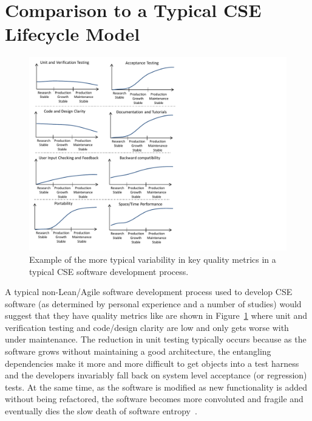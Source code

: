 \documentclass[11pt]{SANDreport}
\begin{document}
%
\section{Comparison to a Typical CSE Lifecycle Model}
\label{sec:compare_with_typical_CSE_model}
%

\begin{figure}
\begin{center}
\includegraphics[trim = 0.1in 0.1in 4.0in 0.1in, scale=0.85]
{TypicalNonAgileSoftwarePhases}
{}\caption{Example of the more typical variability in key quality
metrics in a typical CSE software development process.}
\label{fig:TypicalNonAgileSoftwarePhases}
\end{center}
\end{figure}

A typical non-Lean/Agile software development process used to develop
CSE software (as determined by personal experience and a number of
studies) would suggest that they have quality metrics like are shown
in Figure~\ref{fig:TypicalNonAgileSoftwarePhases} where unit and
verification testing and code/design clarity are low and only gets
worse with under maintenance.  The reduction in unit testing typically
occurs because as the software grows without maintaining a good
architecture, the entangling dependencies make it more and more
difficult to get objects into a test harness and the developers
invariably fall back on system level acceptance (or regression) tests.
At the same time, as the software is modified as new functionality is
added without being refactored, the software becomes more convoluted
and fragile and eventually dies the slow death of software
entropy~\cite{MythicalManMonth95}.
\end{document}
